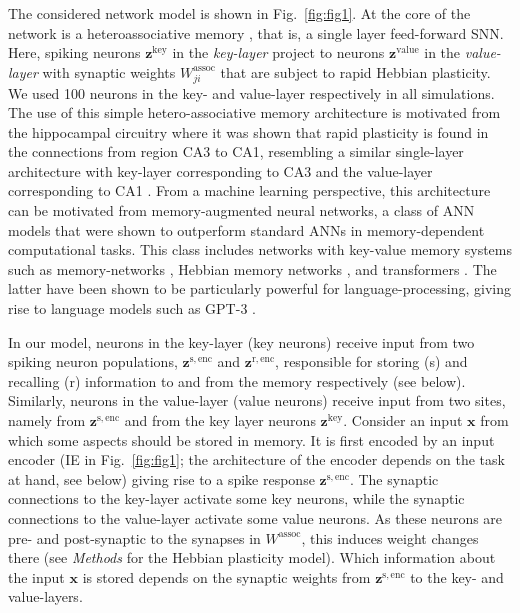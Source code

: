 \documentclass{article}
\newcommand{\vm}[1]{\bm{#1}}
\begin{document}
The considered network model is shown in Fig.~\ref{fig:fig1}. At the core of the network is a heteroassociative memory \cite{willshaw1969non}, that is, a single layer feed-forward SNN. Here, spiking neurons $\vm{z}^{\mathrm{key}}$ in the {\em key-layer} project to neurons $\vm{z}^{\mathrm{value}}$ in the {\em value-layer} with synaptic weights $W_{ji}^{\mathrm{assoc}}$ that are subject to rapid Hebbian plasticity. We used \num{100} neurons in the key- and value-layer respectively in all simulations. The use of this simple hetero-associative memory architecture is motivated from the hippocampal circuitry where it was shown that rapid plasticity is found in the connections from region CA3 to CA1, resembling a similar single-layer architecture with key-layer corresponding to CA3 and the value-layer corresponding to CA1 \cite{bittner2017behavioral,zhao2022rapid}. From a machine learning perspective, this architecture can be motivated from memory-augmented neural networks, a class of \gls{ANN} models that were shown to outperform standard \glspl{ANN} in memory-dependent computational tasks. This class includes networks with key-value memory systems such as memory-networks \cite{weston2015towards,sukhbaatar2015end}, Hebbian memory networks \cite{limbacher2020hmem}, and transformers \cite{vaswani2017attention}. The latter have been shown to be particularly powerful for language-processing, giving rise to language models such as GPT-3 \cite{brown2020language}.

In our model, neurons in the key-layer (key neurons) receive input from two spiking neuron populations, $\vm{z}^{\mathrm{s,enc}}$ and $\vm{z}^{\mathrm{r,enc}}$, 
responsible for storing (s) and recalling (r) information to and from the memory respectively (see below).
Similarly, neurons in the value-layer (value neurons) receive input from two sites, namely from $\vm{z}^{\mathrm{s,enc}}$ and from the key layer neurons $\vm{z}^{\mathrm{key}}$.
Consider an input $\vm{x}$ from which some aspects should be stored in memory. It is first encoded by an input encoder (IE in Fig.~\ref{fig:fig1}; the architecture of the encoder depends on the task at hand, see below) giving rise to a spike response $\vm{z}^{\mathrm{s,enc}}$. The synaptic connections to the key-layer activate some key neurons, while the synaptic connections to the value-layer activate some value neurons. As these neurons are pre- and post-synaptic to the synapses in  $W^{\mathrm{assoc}}$, this induces weight changes there (see \emph{Methods} for the Hebbian plasticity model). Which information about the input $\vm{x}$ is stored depends on the synaptic weights from $\vm{z}^{\mathrm{s,enc}}$ to the key- and value-layers.
\end{document}
